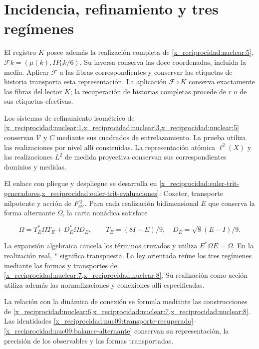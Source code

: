 \section{Incidencia, refinamiento y tres regímenes}

El registro \(K\) posee además la realización completa de
\cref{x_reciprocidad:nuclear:5},
\(\mathcal Fk=(\mu(k),IP_0k/6)\).
Su inversa conserva las doce coordenadas, incluida la media.
Aplicar \(\mathcal F\) a las fibras correspondientes y conservar
las etiquetas de historia transporta esta representación.
La aplicación \(\mathcal F\circ K\) conserva exactamente las fibras
del lector \(K\); la recuperación de historias completas procede
de \(r\) o de sus etiquetas efectivas.

Los sistemas de refinamiento isométrico de
\cref{x_reciprocidad:nuclear:1,x_reciprocidad:nuclear:3,x_reciprocidad:nuclear:5} conservan
\(\mathcal V\) y \(C\) mediante sus cuadrados de entrelazamiento.
La prueba utiliza las realizaciones por nivel allí construidas.
La representación atómica \(\ell^2(X)\) y las realizaciones
\(L^2\) de medida proyectiva conservan sus correspondientes
dominios y medidas.

El enlace con pliegue y despliegue se desarrolla en
\cref{x_reciprocidad:euler-trit-generadores,x_reciprocidad:euler-trit-evaluaciones}:
Coxeter, transporte nilpotente y acción de \(F_{\rm av}^2\).
Para cada realización bidimensional \(E\) que conserva la forma
alternante \(\Omega\), la carta nonádica satisface



\begin{equation}
\Omega=T_E^*\Omega T_E+D_E^*\Omega D_E,
\qquad T_E=(8I+E)/9,\quad D_E=\sqrt8(E-I)/9.
\label{x_reciprocidad:nuc09:balance-alternante}
\end{equation}



La expansión algebraica cancela los términos cruzados y utiliza
\(E^*\Omega E=\Omega\). En la realización real,
\(*\) significa transpuesta.
La ley orientada reúne los tres regímenes mediante las formas
y transportes de \cref{x_reciprocidad:nuclear:7,x_reciprocidad:nuclear:8}.
Su realización como acción utiliza además las normalizaciones
y conexiones allí especificadas.

La relación con la dinámica de conexión se formula mediante
las construcciones de \cref{x_reciprocidad:nuclear:6,x_reciprocidad:nuclear:7,x_reciprocidad:nuclear:8}.
Las identidades
\eqref{x_reciprocidad:nuc09:transporte-recuperado}--\eqref{x_reciprocidad:nuc09:balance-alternante}
conservan su representación, la precisión de los observables
y las formas transportadas.
